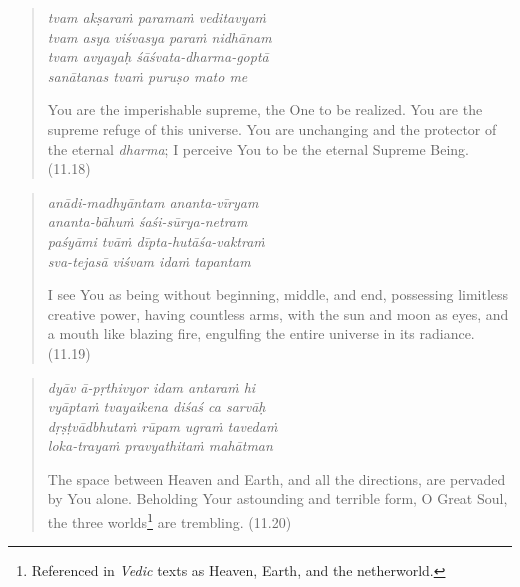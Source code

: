 \documentclass[12pt, twoside, openright]{memoir}
\begin{document}
\par
\begin{verse}
\textit{tvam akṣaraṁ paramaṁ veditavyaṁ} \\
\textit{tvam asya viśvasya paraṁ nidhānam} \\
\textit{tvam avyayaḥ śāśvata-dharma-goptā} \\
\textit{sanātanas tvaṁ puruṣo mato me}

\noindent You are the imperishable supreme, the One to be realized. You are the supreme refuge of this universe. You are unchanging and the protector of the eternal \textit{dharma}; I perceive You to be the eternal Supreme Being. (11.18)
\end{verse}
\par



\par
\begin{verse}
\textit{anādi-madhyāntam ananta-vīryam} \\
\textit{ananta-bāhuṁ śaśi-sūrya-netram} \\
\textit{paśyāmi tvāṁ dīpta-hutāśa-vaktraṁ} \\
\textit{sva-tejasā viśvam idaṁ tapantam}

\noindent I see You as being without beginning, middle, and end, possessing limitless creative power, having countless arms, with the sun and moon as eyes, and a mouth like blazing fire, engulfing the entire universe in its radiance. (11.19)
\end{verse}
\par



\par
\begin{verse}
\textit{dyāv ā-pṛthivyor idam antaraṁ hi} \\
\textit{vyāptaṁ tvayaikena diśaś ca sarvāḥ} \\
\textit{dṛṣṭvādbhutaṁ rūpam ugraṁ tavedaṁ} \\
\textit{loka-trayaṁ pravyathitaṁ mahātman}

\noindent The space between Heaven and Earth, and all the directions, are pervaded by You alone. Beholding Your astounding and terrible form, O Great Soul, the three worlds\footnote{Referenced in \textit{Vedic} texts as Heaven, Earth, and the netherworld.} are trembling. (11.20)
\end{verse}
\par
\end{document}
